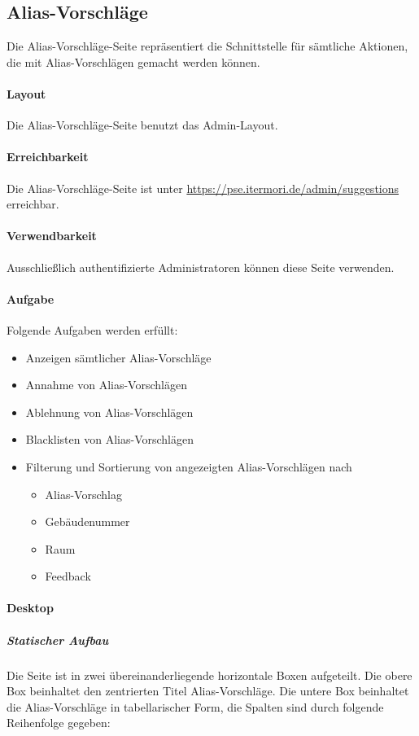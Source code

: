 \subsection{Alias-Vorschläge}

Die Alias-Vorschläge-Seite repräsentiert die Schnittstelle für sämtliche Aktionen, die mit Alias-Vorschlägen gemacht werden können.

\paragraph*{Layout}
Die Alias-Vorschläge-Seite benutzt das Admin-Layout.

\paragraph*{Erreichbarkeit}
Die Alias-Vorschläge-Seite ist unter \href{https://pse.itermori.de/admin/suggestions}{https://pse.itermori.de/admin/suggestions} erreichbar.

\paragraph*{Verwendbarkeit}
Ausschließlich authentifizierte Administratoren können diese Seite verwenden.

\paragraph*{Aufgabe}
Folgende Aufgaben werden erfüllt:

\begin{itemize}
    \item Anzeigen sämtlicher Alias-Vorschläge
    \item Annahme von Alias-Vorschlägen
    \item Ablehnung von Alias-Vorschlägen
    \item Blacklisten von Alias-Vorschlägen
    \item Filterung und Sortierung von angezeigten Alias-Vorschlägen nach 
    \begin{itemize}
        \item Alias-Vorschlag
        \item Gebäudenummer
        \item Raum
        \item Feedback
    \end{itemize}
\end{itemize}

\paragraph*{Desktop}
\subparagraph*{Statischer Aufbau}
Die Seite ist in zwei übereinanderliegende horizontale Boxen aufgeteilt.
Die obere Box beinhaltet den zentrierten Titel \dq Alias-Vorschläge\dq.
Die untere Box beinhaltet die Alias-Vorschläge in tabellarischer Form, die Spalten sind durch folgende Reihenfolge gegeben:

